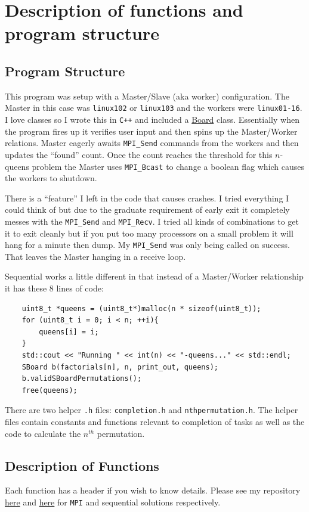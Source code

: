 \documentclass{article}
\begin{document}
\section{Description of functions and program structure}
\subsection{Program Structure}
This program was setup with a Master/Slave (aka worker) configuration. The 
Master in this case was \verb|linux102| or \verb|linux103| and the workers were 
\verb|linux01-16|. I love classes so I wrote this in \verb|C++| and included a 
\href{}{Board} class. Essentially when the program fires up it verifies user 
input and then spins up the Master/Worker relations. Master eagerly awaits 
\verb|MPI_Send| commands from the workers and then updates the ``found'' count. 
Once the count reaches the threshold for this $n$-queens problem the Master uses 
\verb|MPI_Bcast| to change a boolean flag which causes the workers to shutdown. 

There is a ``feature'' I left in the code that causes crashes. I tried 
everything I could think of but due to the graduate requirement of early exit it 
completely messes with the \verb|MPI_Send| and \verb|MPI_Recv|. I tried all 
kinds of combinations to get it to exit cleanly but if you put too many 
processors on a small problem it will hang for a minute then dump. My 
\verb|MPI_Send| was only being called on success. That leaves the Master hanging 
in a receive loop.

Sequential works a little different in that instead of a Master/Worker 
relationship it has these 8 lines of code:

\begin{verbatim}
    uint8_t *queens = (uint8_t*)malloc(n * sizeof(uint8_t));
    for (uint8_t i = 0; i < n; ++i){
        queens[i] = i;
    }
    std::cout << "Running " << int(n) << "-queens..." << std::endl;
    SBoard b(factorials[n], n, print_out, queens);
    b.validSBoardPermutations();
    free(queens);
\end{verbatim}

There are two helper \verb|.h| files: \verb|completion.h| and 
\verb|nthpermutation.h|. The helper files contain constants and functions 
relevant to completion of tasks as well as the code to calculate the $n^{th}$ 
permutation.

\subsection{Description of Functions}
Each function has a header if you wish to know details. Please see my repository 
\href{https://github.com/macattackftw/HighPerfComputing/tree/master/final}{here} 
and 
\href{https://github.com/macattackftw/HighPerfComputing/tree/master/seqfinal}{here} 
for \verb|MPI| and sequential solutions respectively.
\end{document}
